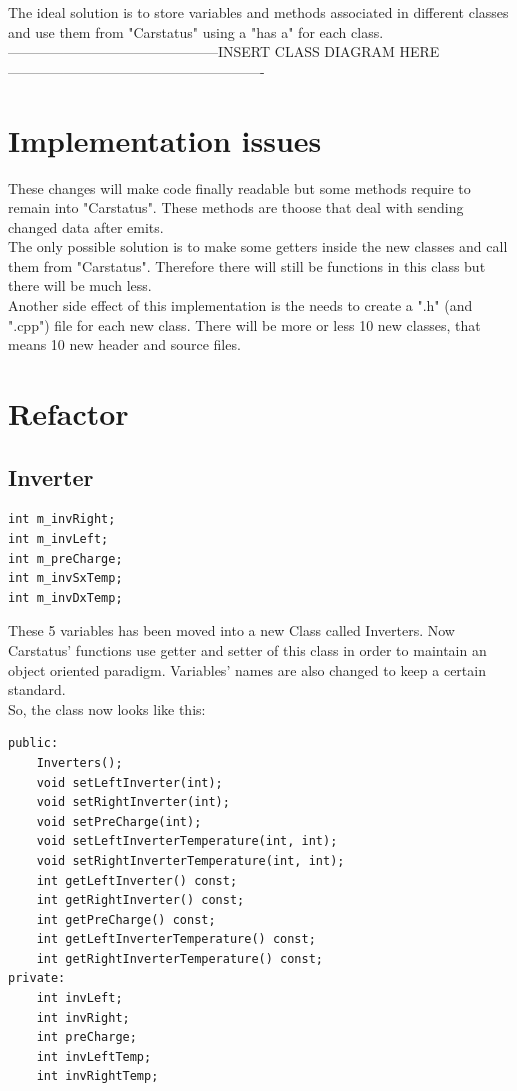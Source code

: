 \documentclass[12pt, letterpaper]{article}
\begin{document}
\begin{flushleft}
\begin{figure}[h]
\end{figure}
\newline
\newline
	The ideal solution is to store variables and methods associated in different classes and use them from "Carstatus" using a "has a" for each class.\\
	---------------------------------------------INSERT CLASS DIAGRAM HERE-------------------------------------------------------

\section{Implementation issues}
	These changes will make code finally readable but some methods require to remain into "Carstatus". These methods are thoose that deal with sending changed data after emits.\\
	The only possible solution is to make some getters inside the new classes and call them from "Carstatus". Therefore there will still be functions in this class but there will be much less.\\
	Another side effect of this implementation is the needs to create a ".h" (and ".cpp") file for each new class. There will be more or less 10 new classes, that means 10 new header and source files.

\section{Refactor}
\subsection{Inverter}
\begin{verbatim}
int m_invRight;
int m_invLeft;
int m_preCharge;
int m_invSxTemp;
int m_invDxTemp;
\end{verbatim}
These 5 variables has been moved into a new Class called Inverters. Now Carstatus' functions use getter and setter of this class in order to maintain an object oriented paradigm. Variables' names are also changed to keep a certain standard.\\
So, the class now looks like this:
\begin{verbatim}
public:
    Inverters();
    void setLeftInverter(int);
    void setRightInverter(int);
    void setPreCharge(int);
    void setLeftInverterTemperature(int, int);
    void setRightInverterTemperature(int, int);
    int getLeftInverter() const;
    int getRightInverter() const;
    int getPreCharge() const;
    int getLeftInverterTemperature() const;
    int getRightInverterTemperature() const;
private:
    int invLeft;
    int invRight;
    int preCharge;
    int invLeftTemp;
    int invRightTemp;
\end{verbatim}


\end{flushleft}
\end{document}
